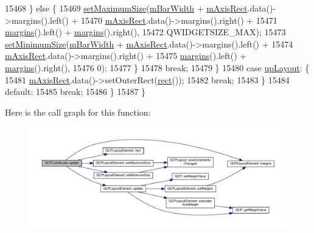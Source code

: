 \begin{DoxyCode}
15468     \} \textcolor{keywordflow}{else} \{
15469       \hyperlink{class_q_c_p_layout_element_a74eb5280a737ab44833d506db65efd95}{setMaximumSize}(\hyperlink{class_q_c_p_color_scale_a409d2ab78dff1f92da5e6acfb062e811}{mBarWidth} + \hyperlink{class_q_c_p_color_scale_a6e37f7d49cd614dc50ef1caae60461b9}{mAxisRect}.data()->margins().left() +
15470                          \hyperlink{class_q_c_p_color_scale_a6e37f7d49cd614dc50ef1caae60461b9}{mAxisRect}.data()->margins().right() +
15471                          \hyperlink{class_q_c_p_layout_element_a85ff977dfcced84eef32d9f819ec9543}{margins}().left() + \hyperlink{class_q_c_p_layout_element_a85ff977dfcced84eef32d9f819ec9543}{margins}().right(),
15472                      QWIDGETSIZE\_MAX);
15473       \hyperlink{class_q_c_p_layout_element_a5dd29a3c8bc88440c97c06b67be7886b}{setMinimumSize}(\hyperlink{class_q_c_p_color_scale_a409d2ab78dff1f92da5e6acfb062e811}{mBarWidth} + \hyperlink{class_q_c_p_color_scale_a6e37f7d49cd614dc50ef1caae60461b9}{mAxisRect}.data()->margins().left() +
15474                          \hyperlink{class_q_c_p_color_scale_a6e37f7d49cd614dc50ef1caae60461b9}{mAxisRect}.data()->margins().right() +
15475                          \hyperlink{class_q_c_p_layout_element_a85ff977dfcced84eef32d9f819ec9543}{margins}().left() + \hyperlink{class_q_c_p_layout_element_a85ff977dfcced84eef32d9f819ec9543}{margins}().right(),
15476                      0);
15477     \}
15478     \textcolor{keywordflow}{break};
15479   \}
15480   \textcolor{keywordflow}{case} \hyperlink{class_q_c_p_layout_element_a0d83360e05735735aaf6d7983c56374da5d1ccf5d79967c232c3c511796860045}{upLayout}: \{
15481     \hyperlink{class_q_c_p_color_scale_a6e37f7d49cd614dc50ef1caae60461b9}{mAxisRect}.data()->setOuterRect(\hyperlink{class_q_c_p_layout_element_affdfea003469aac3d0fac5f4e06171bc}{rect}());
15482     \textcolor{keywordflow}{break};
15483   \}
15484   \textcolor{keywordflow}{default}:
15485     \textcolor{keywordflow}{break};
15486   \}
15487 \}
\end{DoxyCode}


Here is the call graph for this function\+:\nopagebreak
\begin{figure}[H]
\begin{center}
\leavevmode
\includegraphics[width=350pt]{class_q_c_p_color_scale_ab8f6991ac88243fc582b44b183670334_cgraph}
\end{center}
\end{figure}


